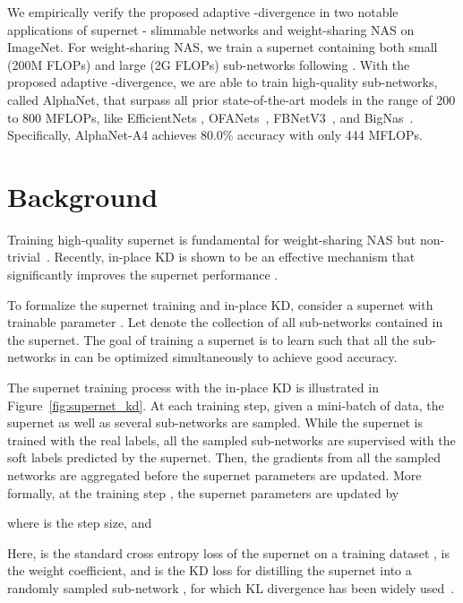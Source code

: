 \documentclass{article}
\begin{document}
We empirically verify the proposed adaptive -divergence in two notable applications of supernet - slimmable networks \citep{yu2019universally, yu2018slimmable} and weight-sharing NAS \citep{yu2020bignas, wang2020attentivenas} on ImageNet. For weight-sharing NAS, we train a supernet containing both small (200M FLOPs) and large (2G FLOPs) sub-networks following \citet{wang2020attentivenas}. With the proposed adaptive -divergence, we are able to train high-quality sub-networks, called AlphaNet, that surpass all prior state-of-the-art models in the range of 200 to 800 MFLOPs, like EfficientNets \citep{tan2019efficientnet}, OFANets~\citep{cai2019once}, FBNetV3~\citep{dai2020fbnetv3}, and BigNas~\citep{yu2020bignas}. 
Specifically, AlphaNet-A4 achieves 80.0\% accuracy with only 444 MFLOPs.



 
\section{Background}


Training high-quality supernet is fundamental for weight-sharing NAS but non-trivial~\citep{benyahia2019overcoming}. 
Recently, in-place KD is shown to be an effective mechanism that significantly improves the supernet performance \citep{yu2019universally, yu2020bignas}. 

To formalize the supernet training and in-place KD, consider a supernet with trainable parameter .
Let  denote the collection of all sub-networks contained in the supernet. 
The goal of training a supernet is to learn  such that all the sub-networks in  can be optimized simultaneously to achieve good accuracy.

The supernet training process with the in-place KD is illustrated in Figure~\ref{fig:supernet_kd}. At each training step, given a mini-batch of data, the supernet as well as several sub-networks are sampled. While the supernet is trained with the real labels, all the sampled sub-networks are supervised with the soft labels predicted by the supernet. Then, the gradients from all the sampled networks are aggregated before the supernet parameters are updated. More formally, at the training step , the supernet parameters  are updated by

where  is the step size, and

Here,  is the standard cross entropy loss of the supernet on a training dataset ,  is the weight coefficient, and  is the KD loss for distilling the supernet into a randomly sampled sub-network , for which KL divergence has been widely used~\citep[e.g.,][]{yu2020bignas}.
\end{document}
